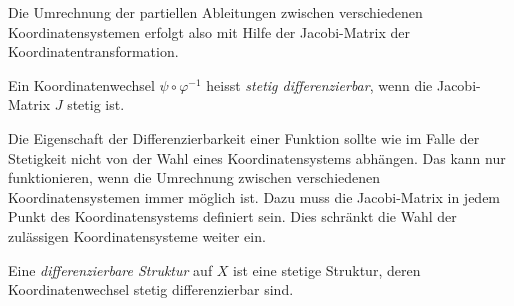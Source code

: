 Die Umrechnung der partiellen Ableitungen zwischen verschiedenen
Koordinatensystemen erfolgt also mit Hilfe der Jacobi-Matrix der
Koordinatentransformation.

\begin{definition}
Ein Koordinatenwechsel $\psi\circ\varphi^{-1}$ heisst
{\em stetig differenzierbar}, wenn die Jacobi-Matrix $J$
stetig ist.
\end{definition}

Die Eigenschaft der Differenzierbarkeit einer Funktion sollte wie
im Falle der Stetigkeit nicht von der Wahl eines Koordinatensystems
abhängen.
Das kann nur funktionieren, wenn die Umrechnung zwischen verschiedenen
Koordinatensystemen immer möglich ist.
Dazu muss die Jacobi-Matrix in jedem Punkt des Koordinatensystems
definiert sein.
Dies schränkt die Wahl der zulässigen Koordinatensysteme weiter ein.

\begin{definition}
\label{buch:koordinaten:koordinaten:definition:diffbareestruktur}
Eine {\em differenzierbare Struktur} auf $X$ ist eine stetige Struktur,
%
%
deren Koordinatenwechsel stetig differenzierbar sind.
\end{definition}

